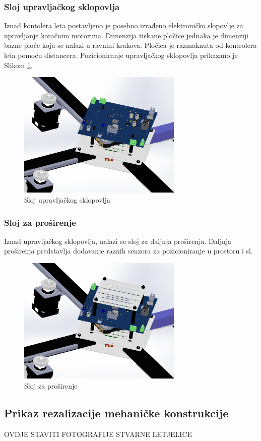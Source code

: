 \documentclass[11pt,a4paper]{article}
\begin{document}
\subsubsection{Sloj upravljačkog sklopovlja}

Iznad kontolera leta postavljeno je posebno izrađeno elektroničko slopovlje za upravljanje koračnim motorima. Dimenzija tiskane pločice jednaka je dimenziji bazne ploče koja se nalazi u ravnini krakova. Pločica je 
razmaknuta od kontrolera leta pomoću distancera. Pozicioniranje upravljačkog sklopovlja prikazano je Slikom \ref{fig:slot_pcb}.


\begin{figure}[H]
	\centering
	\includegraphics[width=0.7\textwidth]{figures/arducopter_slot_pcb.png}
	\caption{Sloj upravljačkog sklopovlja}
	\label{fig:slot_pcb}
\end{figure}

\subsubsection{Sloj za proširenje}
Iznad upravljačkog sklopovlja, nalazi se sloj za daljnja proširenja. Daljnja proširenja predstavlja dodavanje raznih senzora za pozicioniranje u prostoru i sl. 

\begin{figure}[H]
	\centering
	\includegraphics[width=0.7\textwidth]{figures/arducopter_slot_top.png}
	\caption{Sloj za proširenje}
	\label{fig:slot_top}
\end{figure}

\subsection{Prikaz rezalizacije mehaničke konstrukcije}
OVDJE STAVITI FOTOGRAFIJE STVARNE LETJELICE
\end{document}
